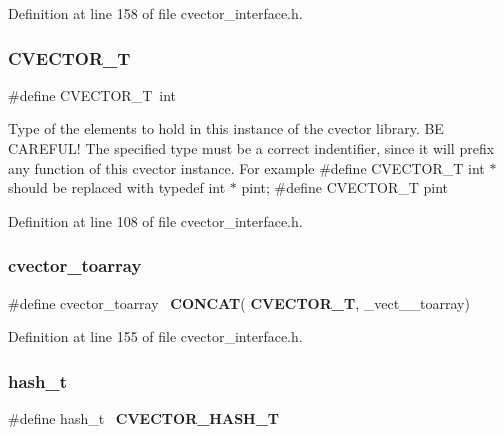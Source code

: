 Definition at line 158 of file cvector\+\_\+interface.\+h.

\mbox{\label{cvector__interface_8h_a5e15da722d5963a5f7bcef8bbbfa1638}} 
\subsubsection{C\+V\+E\+C\+T\+O\+R\+\_\+T}
{\footnotesize\ttfamily \#define C\+V\+E\+C\+T\+O\+R\+\_\+T~int}

Type of the elements to hold in this instance of the cvector library. BE C\+A\+R\+E\+F\+U\+L! The specified type must be a correct indentifier, since it will prefix any function of this cvector instance. For example \#define C\+V\+E\+C\+T\+O\+R\+\_\+T int $\ast$ should be replaced with typedef int $\ast$ pint; \#define C\+V\+E\+C\+T\+O\+R\+\_\+T pint 

Definition at line 108 of file cvector\+\_\+interface.\+h.

\mbox{\label{cvector__interface_8h_a385ae55033d32896e9d4be4325bea78c}} 
\subsubsection{cvector\+\_\+toarray}
{\footnotesize\ttfamily \#define cvector\+\_\+toarray~\textbf{ C\+O\+N\+C\+AT}(\textbf{ C\+V\+E\+C\+T\+O\+R\+\_\+T}, \+\_\+vect\+\_\+\+\_\+toarray)}



Definition at line 155 of file cvector\+\_\+interface.\+h.

\mbox{\label{cvector__interface_8h_ab1b394a82c540c8a85b27083cfb98948}} 
\subsubsection{hash\+\_\+t}
{\footnotesize\ttfamily \#define hash\+\_\+t~\textbf{ C\+V\+E\+C\+T\+O\+R\+\_\+\+H\+A\+S\+H\+\_\+T}}



